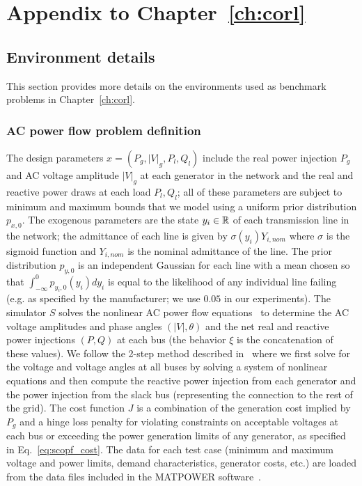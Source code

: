 \chapter{Appendix to Chapter~\ref{ch:corl}}

\section{Environment details}

This section provides more details on the environments used as benchmark problems in Chapter~\ref{ch:corl}.

\subsection{AC power flow problem definition}
The design parameters $x = (P_g, |V|_g, P_l, Q_l)$ include the real power injection $P_g$ and AC voltage amplitude $|V|_g$ at each generator in the network and the real and reactive power draws at each load $P_l, Q_l$; all of these parameters are subject to minimum and maximum bounds that we model using a uniform prior distribution $p_{x, 0}$. The exogenous parameters are the state $y_i \in \mathbb{R}$ of each transmission line in the network; the admittance of each line is given by $\sigma(y_i) Y_{i, nom}$ where $\sigma$ is the sigmoid function and $Y_{i, nom}$ is the nominal admittance of the line. The prior distribution $p_{y, 0}$ is an independent Gaussian for each line with a mean chosen so that $\int_{-\infty}^0 p_{y_i, 0}(y_i) dy_i$ is equal to the likelihood of any individual line failing (e.g. as specified by the manufacturer; we use $0.05$ in our experiments). The simulator $S$ solves the nonlinear AC power flow equations~\cite{cainHistoryOptimalPower2012} to determine the AC voltage amplitudes and phase angles $(|V|, \theta)$ and the net real and reactive power injections $(P, Q)$ at each bus (the behavior $\xi$ is the concatenation of these values). We follow the 2-step method described in~\cite{dontiDC3LearningMethod2021} where we first solve for the voltage and voltage angles at all buses by solving a system of nonlinear equations and then compute the reactive power injection from each generator and the power injection from the slack bus (representing the connection to the rest of the grid). The cost function $J$ is a combination of the generation cost implied by $P_g$ and a hinge loss penalty for violating constraints on acceptable voltages at each bus or exceeding the power generation limits of any generator, as specified in Eq.~\ref{eq:scopf_cost}. The data for each test case (minimum and maximum voltage and power limits, demand characteristics, generator costs, etc.) are loaded from the data files included in the MATPOWER software~\cite{zimmermanMATPOWERSteadyStateOperations2011}.

